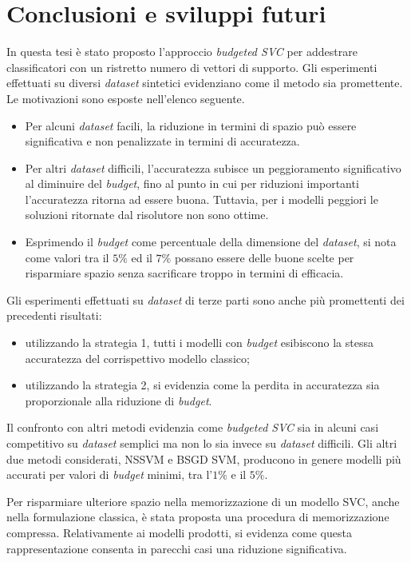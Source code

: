 \chapter{Conclusioni e sviluppi futuri}
\label{chap:conclusioni}
In questa tesi è stato proposto l'approccio \emph{budgeted SVC} per addestrare classificatori con un ristretto numero di vettori di supporto.
Gli esperimenti effettuati su diversi \emph{dataset} sintetici evidenziano come il metodo sia promettente. 
Le motivazioni sono esposte nell'elenco seguente.
\begin{itemize}
    \item Per alcuni \emph{dataset} facili, la riduzione in termini di spazio può essere significativa e non penalizzate in termini di accuratezza.
    \item Per altri \emph{dataset} difficili, l'accuratezza subisce un peggioramento significativo al diminuire del \emph{budget}, fino al punto in cui per riduzioni importanti l'accuratezza ritorna ad essere buona. Tuttavia, per i modelli peggiori le soluzioni ritornate dal risolutore non sono ottime.
    \item Esprimendo il \emph{budget} come percentuale della dimensione del \emph{dataset}, si nota come valori tra il $5\%$ ed il $7\%$ possano essere delle buone scelte per risparmiare spazio senza sacrificare troppo in termini di efficacia.
\end{itemize}

Gli esperimenti effettuati su \emph{dataset} di terze parti sono anche più promettenti dei precedenti risultati:
\begin{itemize}
    \item utilizzando la strategia 1, tutti i modelli con \emph{budget} esibiscono la stessa accuratezza del corrispettivo modello classico;
    \item utilizzando la strategia 2, si evidenzia come la perdita in accuratezza sia proporzionale alla riduzione di \emph{budget}.
\end{itemize}

Il confronto con altri metodi evidenzia come \emph{budgeted SVC} sia in alcuni casi competitivo su \emph{dataset} semplici ma non lo sia invece su \emph{dataset} difficili.
Gli altri due metodi considerati, NSSVM e BSGD SVM,  producono in genere modelli più accurati per valori di \emph{budget} minimi, tra l'$1\%$ e il $5\%$.

Per risparmiare ulteriore spazio nella memorizzazione di un modello SVC, anche nella formulazione classica, è stata proposta una procedura di memorizzazione compressa.
Relativamente ai modelli prodotti, si evidenza come questa rappresentazione consenta in parecchi casi una riduzione significativa.

